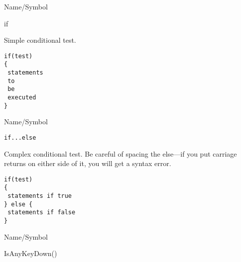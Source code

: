 \rl




\begin{desc}{Name/Symbol}
\item[Name/Symbol]	if 

\item[Description]	Simple conditional test.

\item[Usage]
\begin{verbatim}
if(test)
{
 statements
 to
 be 
 executed
}
\end{verbatim}

\item[Example]	

\item[See Also]	
\end{desc}

\rl




\begin{desc}{Name/Symbol}
\item[Name/Symbol]	\verb+if...else+            

\item[Description]	Complex conditional test.  Be careful of spacing 
		the else---if you put carriage returns on either side 
		of it, you will get a syntax error.

\item[Usage]
\begin{verbatim}
if(test)
{
 statements if true
} else {
 statements if false
}
\end{verbatim}

\item[Example]	

\item[See Also]	
\end{desc}

\rl


\begin{desc}{Name/Symbol}
\item[Name/Symbol]	IsAnyKeyDown()

\item[Description]	

\item[Usage]		

\item[Example]	

\item[See Also]	
\end{desc}

\rl


